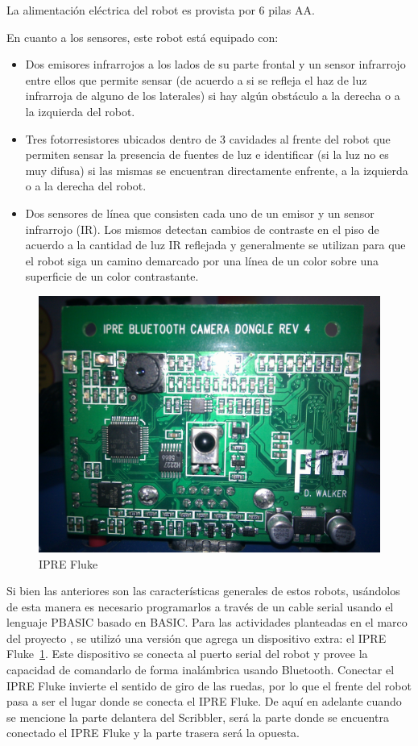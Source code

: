 La alimentación eléctrica del robot es provista por 6 pilas AA.

En cuanto a los sensores, este robot está equipado con:
\begin{itemize}
    \item Dos emisores infrarrojos a los lados de su parte frontal y un
        sensor infrarrojo entre ellos que permite sensar (de acuerdo a si se
        refleja el haz de luz infrarroja de alguno de los laterales) si
        hay algún obstáculo a la derecha o a la izquierda del robot.
    \item Tres fotorresistores ubicados dentro de 3 cavidades al frente del
        robot que permiten sensar la presencia de fuentes de luz e
        identificar (si la luz no es muy difusa) si las mismas se encuentran
        directamente enfrente, a la izquierda o a la derecha del robot.
    \item Dos sensores de línea que consisten cada uno de un emisor
        y un sensor infrarrojo (IR). Los mismos detectan cambios de contraste
        en el piso de acuerdo a la cantidad de luz IR reflejada y generalmente
        se utilizan para que el robot siga un camino demarcado por una línea
        de un color sobre una superficie de un color contrastante.
\end{itemize}

\begin{figure}
    \includegraphics[width=0.5\linewidth]{figures/fluke}
    \caption{IPRE Fluke}
    \label{fig:foto_fluke}
\end{figure}

Si bien las anteriores son las características generales de estos robots, usándolos
de esta manera es necesario programarlos a través de un cable serial usando el
lenguaje PBASIC basado en BASIC. Para las actividades planteadas en el marco del
proyecto \proyecto{}, se utilizó  una versión
que agrega un dispositivo extra: el IPRE Fluke~\ref{fig:foto_fluke}.
Este dispositivo se conecta al puerto
serial del robot y provee la capacidad de comandarlo de forma inalámbrica
usando Bluetooth.  Conectar el
IPRE Fluke invierte el sentido de giro de las ruedas, por lo que el frente
del robot pasa a ser el lugar donde se conecta el IPRE Fluke. De aquí
en adelante cuando se mencione la parte delantera del Scribbler, será la
parte donde se encuentra conectado el IPRE Fluke y la parte trasera será la
opuesta.

